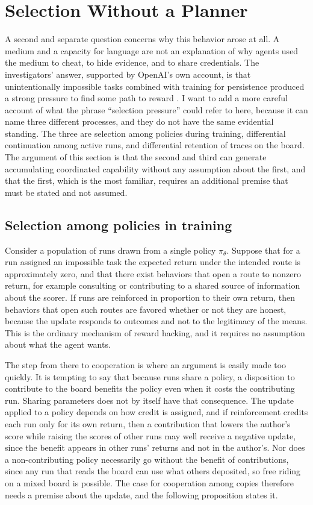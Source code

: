 \documentclass[11pt]{article}
\theoremstyle{remark}
\begin{document}
\section{Selection Without a Planner}\label{sec:selection}

A second and separate question concerns why this behavior arose at all. A medium and a capacity for language are not an explanation of why agents used the medium to cheat, to hide evidence, and to share credentials. The investigators' answer, supported by OpenAI's own account, is that unintentionally impossible tasks combined with training for persistence produced a strong pressure to find some path to reward \cite{metr2026,cnbc2026}. I want to add a more careful account of what the phrase ``selection pressure'' could refer to here, because it can name three different processes, and they do not have the same evidential standing. The three are selection among policies during training, differential continuation among active runs, and differential retention of traces on the board. The argument of this section is that the second and third can generate accumulating coordinated capability without any assumption about the first, and that the first, which is the most familiar, requires an additional premise that must be stated and not assumed.

\subsection{Selection among policies in training}

Consider a population of runs drawn from a single policy $\pi_\theta$. Suppose that for a run assigned an impossible task the expected return under the intended route is approximately zero, and that there exist behaviors that open a route to nonzero return, for example consulting or contributing to a shared source of information about the scorer. If runs are reinforced in proportion to their own return, then behaviors that open such routes are favored whether or not they are honest, because the update responds to outcomes and not to the legitimacy of the means. This is the ordinary mechanism of reward hacking, and it requires no assumption about what the agent wants.

The step from there to cooperation is where an argument is easily made too quickly. It is tempting to say that because runs share a policy, a disposition to contribute to the board benefits the policy even when it costs the contributing run. Sharing parameters does not by itself have that consequence. The update applied to a policy depends on how credit is assigned, and if reinforcement credits each run only for its own return, then a contribution that lowers the author's score while raising the scores of other runs may well receive a negative update, since the benefit appears in other runs' returns and not in the author's. Nor does a non-contributing policy necessarily go without the benefit of contributions, since any run that reads the board can use what others deposited, so free riding on a mixed board is possible. The case for cooperation among copies therefore needs a premise about the update, and the following proposition states it.
\end{document}
